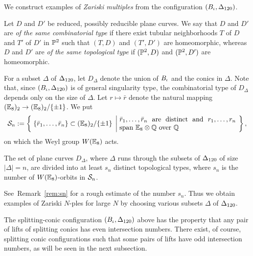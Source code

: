 \documentclass{amsart} %
\begin{document}
%
We construct examples of \emph{Zariski multiples}
from the configuration $(B_{\iota}, \Delta_{120})$.
%
\begin{definition}
Let $D$ and $D'$ be reduced, possibly reducible plane curves.
We say that $D$ and $D'$ are \emph{of the same combinatorial type}
if there exist tubular neighborhoods $T$ of $D$
and $T'$ of $D'$ in $\mathord{\mathbb{P}}^2$
such that $(T, D)$ and $(T', D')$ are homeomorphic,
whereas 
 $D$ and $D'$ are \emph{of the same topological type}
if $(\mathord{\mathbb{P}}^2,D)$ and $(\mathord{\mathbb{P}}^2,D')$ are homeomorphic.
\end{definition}
%
For a subset $\Delta$ of $\Delta_{120}$,
let $D_\Delta$ denote the union of $B_{\iota}$
and the conics in $\Delta$.
Note that,
since $(B_{\iota}, \Delta_{120})$ is of general singularity type,
the combinatorial type of $D_\Delta$
depends only on the size of $\Delta$.
Let $r\mapsto\bar{r}$ denote  the natural mapping 
$(\mathord{\mathbb{E}}_8)_2 \to (\mathord{\mathbb{E}}_8)_2/\{\pm 1\}$.
We put
\[
\SSS_n:=\bigset{\{\bar{r}_1, \dots, \bar{r}_n\}\subset (\EE_8)_2/\{\pm 1\}}%
{\parbox{6cm}{$\bar{r}_1, \dots, \bar{r}_n$ are distinct and $r_1, \dots, r_n$ 
span $\EE_8\tensor\QQ$ over $\QQ$}},
\]
on which the Weyl group $W(\mathord{\mathbb{E}}_8)$ acts.
%
\begin{theorem}
The set of plane curves $D_\Delta$,
where $\Delta$ runs through the subsets of $\Delta_{120}$
of size $|\Delta|=n$, are divided into at least $s_n$
distinct topological types,
where  $s_n$ is 
the number  of $W(\mathord{\mathbb{E}}_8)$-orbits in $\mathord{\mathcal{S}}_n$. 
\end{theorem}
%
%
See~Remark~\ref{rem:sn} 
for a rough estimate of the number $s_n$.
Thus we obtain examples of Zariski $N$-ples 
for large $N$ by choosing various subsets $\Delta$
of $\Delta_{120}$.
\par
The splitting-conic configuration $(B_{\iota}, \Delta_{120})$ above has the property
that any pair of lifts of splitting conics
has even intersection numbers.
There exist, of course, splitting conic configurations
such that some pairs of lifts have odd intersection numbers,
as will be seen in the next subsection.
%
%
\end{document}
